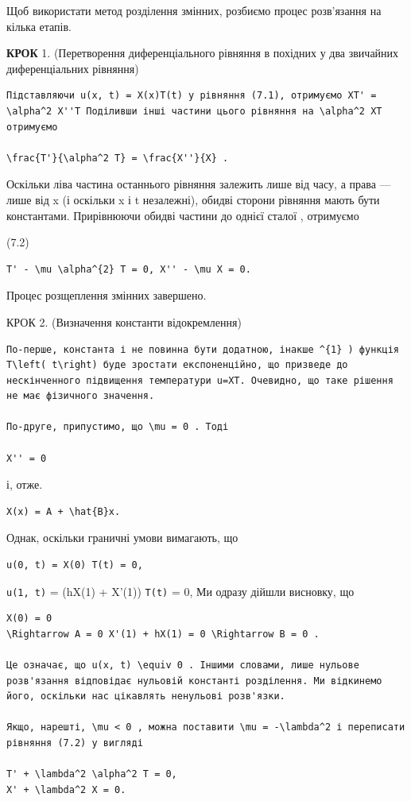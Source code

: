 \documentclass[
  ukrainian,
]{article}
\begin{document}
Щоб використати метод розділення змінних, розбиємо процес розв'язання на
кілька етапів.

\textbf{КРОК} 1. (Перетворення диференціального рівняння в похідних у
два звичайних диференціальних рівняння)

\begin{verbatim}
Підставляючи u(x, t) = X(x)T(t) у рівняння (7.1), отримуємо XT' = \alpha^2 X''T Поділивши інші частини цього рівняння на \alpha^2 XT отримуємо

\frac{T'}{\alpha^2 T} = \frac{X''}{X} .
\end{verbatim}

Оскільки ліва частина останнього рівняння залежить лише від часу, а
права --- лише від x (і оскільки x і t незалежні), обидві сторони
рівняння мають бути константами. Прирівнюючи обидві частини до однієї
сталої \mu , отримуємо

(7.2)

\begin{verbatim}
T' - \mu \alpha^{2} T = 0, X'' - \mu X = 0.
\end{verbatim}

Процес розщеплення змінних завершено.

КРОК 2. (Визначення константи відокремлення)

\begin{verbatim}
По-перше, константа і не повинна бути додатною, інакше ^{1} ) функція T\left( t\right) буде зростати експоненційно, що призведе до нескінченного підвищення температури u=XT. Очевидно, що таке рішення не має фізичного значення.

По-друге, припустимо, що \mu = 0 . Тоді

X'' = 0
\end{verbatim}

і, отже.

\begin{verbatim}
X(x) = A + \hat{B}x.
\end{verbatim}

Однак, оскільки граничні умови вимагають, що

\begin{verbatim}
u(0, t) = X(0) T(t) = 0,
\end{verbatim}

\texttt{u(1,\ t)} = (hX(1) + X'(1)) \texttt{T(t)} = 0, Ми одразу дійшли
висновку, що

\begin{verbatim}
X(0) = 0
\Rightarrow A = 0 X'(1) + hX(1) = 0 \Rightarrow B = 0 .

Це означає, що u(x, t) \equiv 0 . Іншими словами, лише нульове розв'язання відповідає нульовій константі розділення. Ми відкинемо його, оскільки нас цікавлять ненульові розв'язки.

Якщо, нарешті, \mu < 0 , можна поставити \mu = -\lambda^2 і переписати рівняння (7.2) у вигляді

T' + \lambda^2 \alpha^2 T = 0,
X' + \lambda^2 X = 0.
\end{verbatim}
\end{document}
